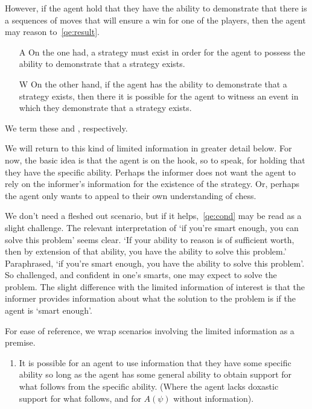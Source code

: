 \documentclass[10pt]{article}
\begin{document}
\begin{note}
  However, if the agent hold that they have the ability to demonstrate that there is a sequences of moves that will ensure a win for one of the players, then the agent may reason to~\ref{qe:result}.

  \begin{enumerate}
  \item[\textsf{A}]\label{A:s} On the one had, a strategy must exist in order for the agent to possess the ability to demonstrate that a strategy exists.
  \item[\textsf{W}]\label{W:s} On the other hand, if the agent has the ability to demonstrate that a strategy exists, then there it is possible for the agent to witness an event in which they demonstrate that a strategy exists.
  \end{enumerate}
  We term these \AR{} and \WR{}, respectively.

  We will return to this kind of limited information in greater detail below.
  For now, the basic idea is that the agent is on the hook, so to speak, for holding that they have the specific ability.
  Perhaps the informer does not want the agent to rely on the informer's information for the existence of the strategy.
  Or, perhaps the agent only wants to appeal to their own understanding of chess.

  We don't need a fleshed out scenario, but if it helps,~\ref{qe:cond} may be read as a slight challenge.
  The relevant interpretation of `if you're smart enough, you can solve this problem' seems clear.
  `If your ability to reason is of sufficient worth, then by extension of that ability, you have the ability to solve this problem.'
  Paraphrased, `if you're smart enough, you have the ability to solve this problem'.
  So challenged, and confident in one's smarts, one may expect to solve the problem.
  The slight difference with the limited information of interest is that the informer provides information about what the solution to the problem is if the agent is `smart enough'.
\end{note}

\begin{note}
  For ease of reference, we wrap scenarios involving the limited information as a premise.
  \begin{enumerate}[label=\eA{}, ref=\eA{}]
  \item\label{prem:ab} It is possible for an agent to use information that they have some specific ability so long as the agent has some general ability to obtain support for what follows from the specific ability.
    (Where the agent lacks doxastic support for what follows, and for \(A(\psi)\) without information).
  \end{enumerate}
\end{note}
\end{document}

